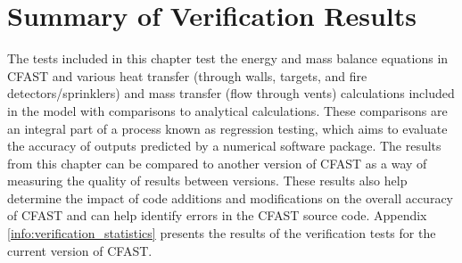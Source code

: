 \section{Summary of Verification Results}

The tests included in this chapter test the energy and mass balance equations in CFAST and various heat transfer (through walls, targets, and fire detectors/sprinklers) and mass transfer (flow through vents) calculations included in the model with comparisons to analytical calculations. These comparisons are an integral part of a process known as regression testing, which aims to evaluate the accuracy of outputs predicted by a numerical software package. The results from this chapter can be compared to another version of CFAST as a way of measuring the quality of results between versions.  These results also help determine the impact of code additions and modifications on the overall accuracy of CFAST and can help identify errors in the CFAST source code. Appendix \ref{info:verification_statistics} presents the results of the verification tests for the current version of CFAST.


